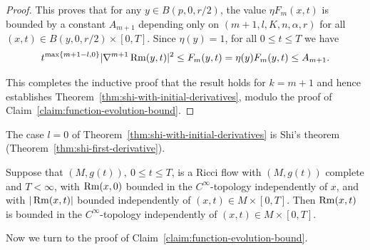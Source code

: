 \begin{proof}
This proves that for any $y\in B(p,0,r/2)$, the value
 $\eta F_m(x,t)$ is bounded by a
constant $A_{m+1}$ depending only on $(m+1,l,K,n,\alpha,r)$ for all
$(x,t)\in B(y,0,r/2)\times [0,T]$. Since $\eta(y)=1$, for all $0\le t\le T$ we have
$$t^{\max\{m+1-l,0\}}|\nabla^{m+1}\operatorname{Rm}(y,t)|^2\le F_m(y,t)=\eta(y)F_m(y,t)\le A_{m+1}.$$



This completes the inductive proof that the result holds for
$k=m+1$ and hence establishes Theorem~\ref{thm:shi-with-initial-derivatives}, modulo the proof of Claim~\ref{claim:function-evolution-bound}.
\end{proof}

\begin{remark}\label{rem:shi-derivative-variant}

The case $l=0$ of Theorem~\ref{thm:shi-with-initial-derivatives} is Shi's theorem
(Theorem~\ref{thm:shi-first-derivative}).
\end{remark}

\begin{corollary}\label{cor:ricci-flow-curvature-bounds}
\label{Cinftybd}

Suppose that $(M,g(t)),\ 0\le t\le T$, is a Ricci flow
with $(M,g(t))$ complete and $T<\infty$, with $\operatorname{Rm}(x,0)$ bounded in
the $C^\infty$-topology independently of $x$, and with $|\operatorname{Rm}(x,t)|$ bounded
independently of $(x,t)\in M\times[0,T]$. Then $\operatorname{Rm}(x,t)$ is bounded in the
$C^\infty$-topology independently of $(x,t)\in M\times[0,T]$.
\end{corollary}




Now we turn to the proof of Claim~\ref{claim:function-evolution-bound}.

